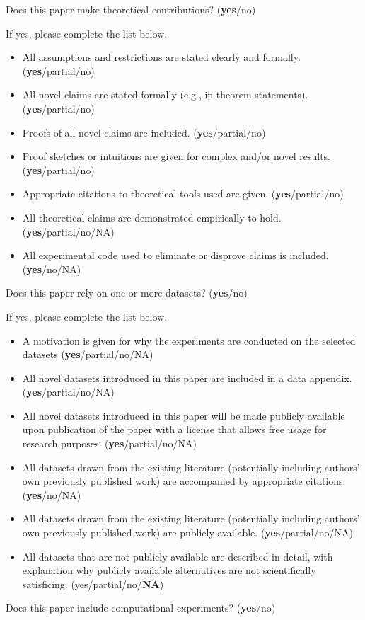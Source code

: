 \documentclass[letterpaper]{article} %
\begin{document}
Does this paper make theoretical contributions? (\textbf{yes}/no)

If yes, please complete the list below.
\begin{itemize}    
    \item
All assumptions and restrictions are stated clearly and formally. (\textbf{yes}/partial/no)
    \item
All novel claims are stated formally (e.g., in theorem statements). (\textbf{yes}/partial/no)
    \item
Proofs of all novel claims are included. (\textbf{yes}/partial/no)
    \item
Proof sketches or intuitions are given for complex and/or novel results. (\textbf{yes}/partial/no)
    \item
Appropriate citations to theoretical tools used are given. (\textbf{yes}/partial/no)
    \item
All theoretical claims are demonstrated empirically to hold. (\textbf{yes}/partial/no/NA)
    \item
All experimental code used to eliminate or disprove claims is included. (\textbf{yes}/no/NA)
\end{itemize}
Does this paper rely on one or more datasets? (\textbf{yes}/no)

If yes, please complete the list below.
\begin{itemize}
    \item
A motivation is given for why the experiments are conducted on the selected datasets (\textbf{yes}/partial/no/NA)
    \item
All novel datasets introduced in this paper are included in a data appendix. (\textbf{yes}/partial/no/NA)
    \item
All novel datasets introduced in this paper will be made publicly available upon publication of the paper with a license that allows free usage for research purposes. (\textbf{yes}/partial/no/NA)
    \item
All datasets drawn from the existing literature (potentially including authors’ own previously published work) are accompanied by appropriate citations. (\textbf{yes}/no/NA)
    \item
All datasets drawn from the existing literature (potentially including authors’ own previously published work) are publicly available. (\textbf{yes}/partial/no/NA)
    \item
All datasets that are not publicly available are described in detail, with explanation why publicly available alternatives are not scientifically satisficing. (yes/partial/no/\textbf{NA})
\end{itemize}
Does this paper include computational experiments? (\textbf{yes}/no)
\end{document}
